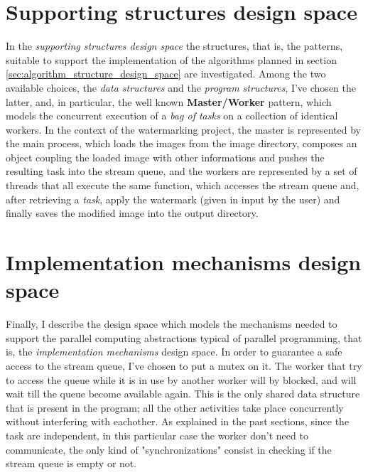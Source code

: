     \section{Supporting structures design space} %
    \label{sec:supporting_structures_design_space}
        In the \textit{supporting structures design space} the structures, that is, the
        patterns, suitable to support the implementation of the algorithms planned in section
        \ref{sec:algorithm_structure_design_space} are investigated. Among the two available choices,
        the \textit{data structures} and the \textit{program structures}, I've chosen the latter, and, in
        particular, the well known \textbf{Master/Worker} pattern, which models the concurrent execution of a
        \textit{bag of tasks} on a collection of identical workers. In the context of the watermarking project,
        the master is represented by the main process, which loads the images from the image directory,
        composes an object coupling the loaded image with other informations and
        pushes the resulting task into the stream queue, and the workers are represented by a set of
        threads that all execute the same function, which accesses the stream queue and, after retrieving a
        \textit{task}, apply the watermark (given in input by the user) and finally saves the modified image
        into the output directory.

    \section{Implementation mechanisms design space} %
    \label{sec:implementation_mechanisms_design_space}
        Finally, I describe the design space which models the mechanisms needed to support the
        parallel computing abstractions typical of parallel programming, that is, the \textit{implementation
        mechanisms} design space. In order to guarantee a safe access to the stream queue, I've chosen to put a
        mutex on it. The worker that try to access the queue while it is in use by another worker will by
        blocked, and will wait till the queue become available again. This is the only shared data
        structure that is present in the program; all the other activities take place concurrently without
        interfering with eachother. As explained in the past sections, since the task are independent, in this
        particular case the worker don't need to communicate, the only kind of "synchronizations" consist in
        checking if the stream queue is empty or not.

